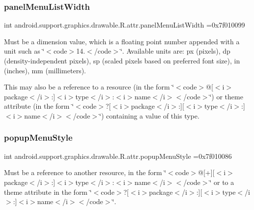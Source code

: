 \subsubsection{\texorpdfstring{panel\+Menu\+List\+Width}{panelMenuListWidth}}
{\footnotesize\ttfamily int android.\+support.\+graphics.\+drawable.\+R.\+attr.\+panel\+Menu\+List\+Width =0x7f010099\hspace{0.3cm}{\ttfamily [static]}}

Must be a dimension value, which is a floating point number appended with a unit such as \char`\"{}$<$code$>$14.\+5sp$<$/code$>$\char`\"{}. Available units are\+: px (pixels), dp (density-\/independent pixels), sp (scaled pixels based on preferred font size), in (inches), mm (millimeters). 

This may also be a reference to a resource (in the form \char`\"{}$<$code$>$@\mbox{[}$<$i$>$package$<$/i$>$\+:\mbox{]}$<$i$>$type$<$/i$>$\+:$<$i$>$name$<$/i$>$$<$/code$>$\char`\"{}) or theme attribute (in the form \char`\"{}$<$code$>$?\mbox{[}$<$i$>$package$<$/i$>$\+:\mbox{]}\mbox{[}$<$i$>$type$<$/i$>$\+:\mbox{]}$<$i$>$name$<$/i$>$$<$/code$>$\char`\"{}) containing a value of this type. \mbox{\label{classandroid_1_1support_1_1graphics_1_1drawable_1_1R_1_1attr_aebd17a8bf52702bf57981f230757ed9e}} 
\subsubsection{\texorpdfstring{popup\+Menu\+Style}{popupMenuStyle}}
{\footnotesize\ttfamily int android.\+support.\+graphics.\+drawable.\+R.\+attr.\+popup\+Menu\+Style =0x7f010086\hspace{0.3cm}{\ttfamily [static]}}

Must be a reference to another resource, in the form \char`\"{}$<$code$>$@\mbox{[}+\mbox{]}\mbox{[}$<$i$>$package$<$/i$>$\+:\mbox{]}$<$i$>$type$<$/i$>$\+:$<$i$>$name$<$/i$>$$<$/code$>$\char`\"{} or to a theme attribute in the form \char`\"{}$<$code$>$?\mbox{[}$<$i$>$package$<$/i$>$\+:\mbox{]}\mbox{[}$<$i$>$type$<$/i$>$\+:\mbox{]}$<$i$>$name$<$/i$>$$<$/code$>$\char`\"{}. \mbox{\label{classandroid_1_1support_1_1graphics_1_1drawable_1_1R_1_1attr_a90e617a1bc9e575ec31de0d1438fe886}} 
